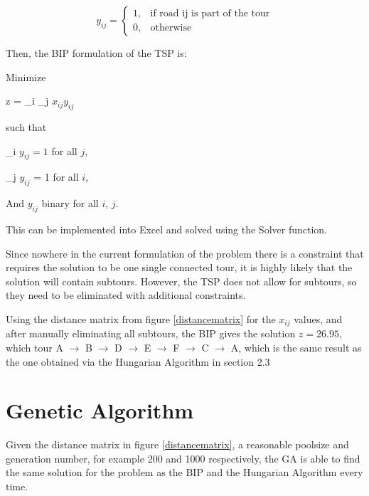 \[
y_{ij}= 
\begin{cases}
1, & \text{if road ij is part of the tour}\\
0, & \text{otherwise}
\end{cases}
\]
	

\vspace{5mm}
Then, the BIP formulation of the TSP is:
\vspace{5mm}	

Minimize

\vspace{-3mm}	
\begin{center}
z = \sum_{i} \sum_{j} $x_{ij}$$y_{ij}$
\end{center}	 

such that
\vspace{-3mm}	
\begin{center}
	\sum_{i} $y_{ij} = 1$ for all $j$,
	
	\sum_{j} $y_{ij}$ = 1 for all $i$,
	
	And $y_{ij}$ binary for all $i$, $j$.
\end{center}	
	
	
This can be implemented into Excel and solved using the Solver function.
\vspace{5mm}

Since nowhere in the current formulation of the problem there is a constraint that requires the solution to be one single connected tour, it is highly likely that the solution will contain subtours. However, the TSP does not allow for subtours, so they need to be eliminated with additional constraints.
\vspace{5mm}

Using the distance matrix from figure \ref{distancematrix} for the $x_{ij}$ values, and after manually eliminating all subtours, the BIP gives the solution $z=26.95$, which tour A $\rightarrow$ B $\rightarrow$ D $\rightarrow$ E $\rightarrow$ F $\rightarrow$ C $\rightarrow$ A, which is the same result as the one obtained via the Hungarian Algorithm in section 2.3
	
	
	
	

\section{Genetic Algorithm}	
	
Given the distance matrix in figure \ref{distancematrix}, a reasonable poolsize and generation number, for example 200 and 1000 respectively, the GA is able to find the same solution for the problem as the BIP and the Hungarian Algorithm every time.


